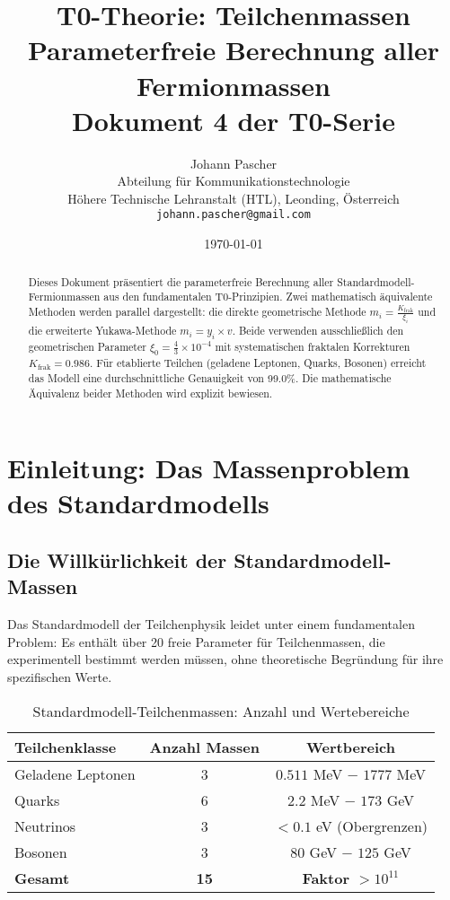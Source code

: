 \documentclass[12pt,a4paper]{article}
\title{\textbf{T0-Theorie: Teilchenmassen}\\[0.5cm]
	\large Parameterfreie Berechnung aller Fermionmassen\\[0.3cm]
	\normalsize Dokument 4 der T0-Serie}
\author{Johann Pascher\\
	Abteilung für Kommunikationstechnologie\\
	Höhere Technische Lehranstalt (HTL), Leonding, Österreich\\
	\texttt{johann.pascher@gmail.com}}
\date{\today}
\begin{document}
	
	\maketitle
	
	\begin{abstract}
		Dieses Dokument präsentiert die parameterfreie Berechnung aller Standardmodell-Fermionmassen aus den fundamentalen T0-Prinzipien. Zwei mathematisch äquivalente Methoden werden parallel dargestellt: die direkte geometrische Methode $m_i = \frac{K_{\text{frak}}}{\xi_i}$ und die erweiterte Yukawa-Methode $m_i = y_i \times v$. Beide verwenden ausschließlich den geometrischen Parameter $\xi_0 = \frac{4}{3} \times 10^{-4}$ mit systematischen fraktalen Korrekturen $K_{\text{frak}} = 0.986$. Für etablierte Teilchen (geladene Leptonen, Quarks, Bosonen) erreicht das Modell eine durchschnittliche Genauigkeit von 99.0\%. Die mathematische Äquivalenz beider Methoden wird explizit bewiesen.
	\end{abstract}
	
	\tableofcontents
	\newpage
	
	\section{Einleitung: Das Massenproblem des Standardmodells}
	
	\subsection{Die Willkürlichkeit der Standardmodell-Massen}
	
	Das Standardmodell der Teilchenphysik leidet unter einem fundamentalen Problem: Es enthält über 20 freie Parameter für Teilchenmassen, die experimentell bestimmt werden müssen, ohne theoretische Begründung für ihre spezifischen Werte.
	
	\begin{table}[h]
		\centering
		\begin{tabular}{lcc}
			\toprule
			\textbf{Teilchenklasse} & \textbf{Anzahl Massen} & \textbf{Wertbereich} \\
			\midrule
			Geladene Leptonen & 3 & $0.511$ MeV $-$ $1777$ MeV \\
			Quarks & 6 & $2.2$ MeV $-$ $173$ GeV \\
			Neutrinos & 3 & $< 0.1$ eV (Obergrenzen) \\
			Bosonen & 3 & $80$ GeV $-$ $125$ GeV \\
			\midrule
			\textbf{Gesamt} & \textbf{15} & \textbf{Faktor $> 10^{11}$} \\
			\bottomrule
		\end{tabular}
		\caption{Standardmodell-Teilchenmassen: Anzahl und Wertebereiche}
	\end{table}
	
\end{document}
